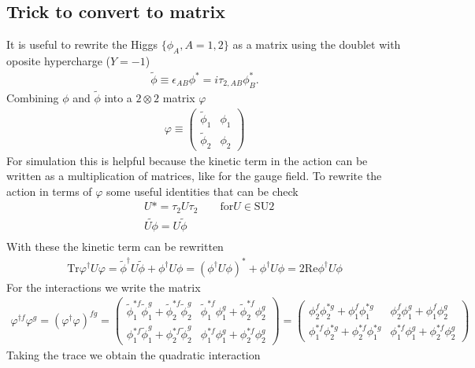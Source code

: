 \documentclass[]{scrartcl}
\newcommand{\tp}{\tilde{\phi}}
\begin{document}
\subsection{Trick to convert to matrix}
It is useful to rewrite the Higgs $\{ \phi_A, A=1,2\}$ as a matrix using the doublet with oposite hypercharge ($Y=-1$)
\begin{align}
	\tilde{\phi}\equiv\epsilon_{AB}\phi^*= i \tau_{2,AB}\phi_B^*.
\end{align}
Combining $\phi$ and $\tilde{\phi}$ into a $2\otimes2$ matrix $\varphi$
\begin{align}
	\varphi\equiv \begin{pmatrix}
		\tp_1 & \phi_1 \\
		\tp_2 & \phi_2
		\end{pmatrix}
\end{align}
For simulation this is helpful because the kinetic term in the action can be written as a multiplication of matrices, like for the gauge field. To rewrite the action in terms of $\varphi$ some useful identities that can be check
\begin{align}
	&U*=\tau_2 U \tau_2 \qquad \text{for} U\in\text{SU}2\\
	&\widetilde{U\phi}=U\tilde{\phi}\\
\end{align}
With these the kinetic term can be rewritten
\begin{align}
	\text{Tr} {\varphi^\dagger U \varphi} = \tp^\dagger U\tp + \phi^\dagger U \phi = (\phi^\dagger U \phi)^* + \phi^\dagger U \phi = 2\text{Re}\phi^\dagger U \phi
\end{align}
For the interactions we write the matrix
\begin{align}
	\varphi^{\dagger f}  \varphi^g = (\varphi^{\dagger}  \varphi)^{fg}= \begin{pmatrix} \tp_1^{*f}\tp_1^g + \tp_2^{*f}\tp_2^g  & \tp_1^{*f}\phi_1^g + \tp_2^{*f}\phi_2^g \\
			\phi_1^{*f}\tp_1^g + \phi_2^{*f}\tp_2^g  & \phi_1^{*f}\phi_1^g + \phi_2^{*f}\phi_2^g 
		\end{pmatrix} =  \begin{pmatrix} \phi_2^f\phi_2^{*g} + \phi_1^f\phi_1^{*g} & \phi_2^f\phi_1^g + \phi_1^f\phi_2^g \\
		\phi_1^{*f}\phi_2^{*g} + \phi_2^{*f}\phi_1^{*g} & \phi_1^{*f}\phi_1^g + \phi_2^{*f}\phi_2^g 
		\end{pmatrix} 
\end{align}
Taking the trace we obtain the quadratic interaction
\end{document}
